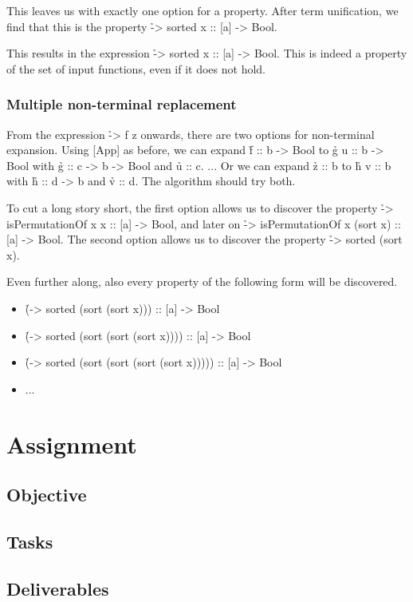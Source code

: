 \documentclass[a4paper, 11pt]{article}
\begin{document}
This leaves us with exactly one option for a property.
After term unification, we find that this is the property \h{\x -> sorted x :: [a] -> Bool}.

This results in the expression \h{\a -> sorted x :: [a] -> Bool}.
This is indeed a property of the set of input functions, even if it does not hold.

\subsubsection{Multiple non-terminal replacement}

From the expression \h{\x -> f z} onwards, there are two options for non-terminal expansion.
Using [App] as before, we can expand \h{f :: b -> Bool} to \h{g u :: b -> Bool} with \h{g :: c -> b -> Bool} and \h{u :: c}.
... Or we can expand \h{z :: b} to \h{h v :: b} with \h{h :: d -> b} and \h{v :: d}.
The algorithm should try both.

To cut a long story short, the first option allows us to discover the property \h{\x -> isPermutationOf x x :: [a] -> Bool}, and later on \h{\x -> isPermutationOf x (sort x) :: [a] -> Bool}.
The second option allows us to discover the property \h{\x -> sorted (sort x)}.

Even further along, also every property of the following form will be discovered.

\begin{itemize}
  \item \h{(\x -> sorted (sort (sort x))) :: [a] -> Bool}
  \item \h{(\x -> sorted (sort (sort (sort x)))) :: [a] -> Bool}
  \item \h{(\x -> sorted (sort (sort (sort (sort x))))) :: [a] -> Bool}
  \item ...
\end{itemize}

\section{Assignment}
\subsection{Objective}

\subsection{Tasks}


\subsection{Deliverables}



\end{document}
